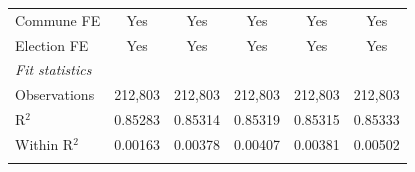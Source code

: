 \begin{tabular}{lccccc}
   Commune FE                             & Yes           & Yes            & Yes           & Yes           & Yes\\  
   Election FE                            & Yes           & Yes            & Yes           & Yes           & Yes\\  
   \midrule
   \emph{Fit statistics}\\
   Observations                           & 212,803       & 212,803        & 212,803       & 212,803       & 212,803\\  
   R$^2$                                  & 0.85283       & 0.85314        & 0.85319       & 0.85315       & 0.85333\\  
   Within R$^2$                           & 0.00163       & 0.00378        & 0.00407       & 0.00381       & 0.00502\\  
   \midrule \midrule & \tabularnewline
\end{tabular}
\par\endgroup
